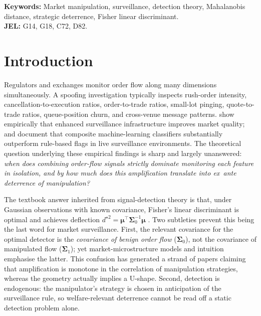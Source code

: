 \documentclass[11pt,a4paper]{article}
\theoremstyle{definition}
\theoremstyle{remark}
\newcommand{\1}{\mathbf{1}}
\newcommand{\mmu}{\boldsymbol{\mu}}
\newcommand{\Sig}{\boldsymbol{\Sigma}}
\newcommand{\trans}{^{\!\top}}
\begin{document}
\textbf{Keywords:} Market manipulation, surveillance, detection theory, Mahalanobis distance, strategic deterrence, Fisher linear discriminant. \\[2pt]
\textbf{JEL:} G14, G18, C72, D82.

\section{Introduction}
\label{sec:intro}

Regulators and exchanges monitor order flow along many dimensions simultaneously. A spoofing investigation typically inspects rush-order intensity, cancellation-to-execution ratios, order-to-trade ratios, small-lot pinging, quote-to-trade ratios, queue-position churn, and cross-venue message patterns. \citet{cumming2011exchange} show empirically that enhanced surveillance infrastructure improves market quality; \citet{james2023machine} and \citet{dhawan2021new} document that composite machine-learning classifiers substantially outperform rule-based flags in live surveillance environments. The theoretical question underlying these empirical findings is sharp and largely unanswered: \emph{when does combining order-flow signals strictly dominate monitoring each feature in isolation, and by how much does this amplification translate into ex~ante deterrence of manipulation?}

The textbook answer inherited from signal-detection theory is that, under Gaussian observations with known covariance, Fisher's linear discriminant is optimal and achieves deflection $d^{\star 2}=\mmu\trans\Sig_0^{-1}\mmu$ \citep{kay1998fundamentals,poor1994introduction}. Two subtleties prevent this being the last word for market surveillance. First, the relevant covariance for the optimal detector is the \emph{covariance of benign order flow} ($\Sig_0$), not the covariance of manipulated flow ($\Sig_1$); yet market-microstructure models and intuition emphasise the latter. This confusion has generated a strand of papers claiming that amplification is monotone in the correlation of manipulation strategies, whereas the geometry actually implies a U-shape. Second, detection is endogenous: the manipulator's strategy is chosen in anticipation of the surveillance rule, so welfare-relevant deterrence cannot be read off a static detection problem alone.
\end{document}

